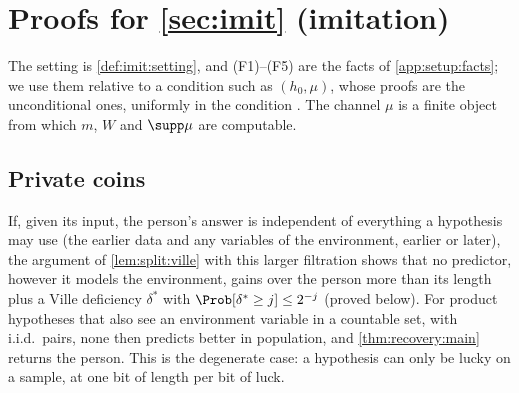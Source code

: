 \section{Proofs for \texorpdfstring{\cref{sec:imit}}{Section \ref*{sec:imit}} (imitation)}\label{app:imit}

The setting is \cref{def:imit:setting}, and (F1)--(F5) are the facts of \cref{app:setup:facts}; we use them relative to a condition such as $(h_0,\mu)$, whose proofs are the unconditional ones, uniformly in the condition \citep{li2008introduction}. The channel $\mu$ is a finite object from which $m$, $W$ and $\supp\mu$ are computable.

\subsection{Private coins}\label{app:imit:private}

\begin{remark}\label{rem:imit:private}
If, given its input, the person's answer is independent of everything a hypothesis may use (the earlier data and any variables of the environment, earlier or later), the argument of \cref{lem:split:ville} with this larger filtration shows that no predictor, however it models the environment, gains over the person more than its length plus a Ville deficiency $\delta^*$ with $\Prob[\delta^*\ge j]\le2^{-j}$ (proved below). For product hypotheses that also see an environment variable in a countable set, with i.i.d.\ pairs, none then predicts better in population, and \cref{thm:recovery:main} returns the person. This is the degenerate case: a hypothesis can only be lucky on a sample, at one bit of length per bit of luck.
\end{remark}

